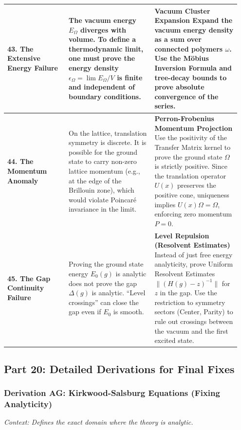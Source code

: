 \begin{center}
\begin{tabular}{|p{0.25\linewidth}|p{0.35\linewidth}|p{0.35\linewidth}|}
\hline
\textbf{43. The Extensive Energy Failure} & The vacuum energy $E_{\Omega}$ diverges with volume. To define a thermodynamic limit, one must prove the energy density $\epsilon_{\Omega} = \lim E_{\Omega}/V$ is finite and independent of boundary conditions. & \textbf{Vacuum Cluster Expansion} \newline Expand the vacuum energy density as a sum over connected polymers $\omega$. Use the Möbius Inversion Formula and tree-decay bounds to prove absolute convergence of the series. \\
\hline
\textbf{44. The Momentum Anomaly} & On the lattice, translation symmetry is discrete. It is possible for the ground state to carry non-zero lattice momentum (e.g., at the edge of the Brillouin zone), which would violate Poincaré invariance in the limit. & \textbf{Perron-Frobenius Momentum Projection} \newline Use the positivity of the Transfer Matrix kernel to prove the ground state $\Omega$ is strictly positive. Since the translation operator $U(x)$ preserves the positive cone, uniqueness implies $U(x)\Omega = \Omega$, enforcing zero momentum $P=0$. \\
\hline
\textbf{45. The Gap Continuity Failure} & Proving the ground state energy $E_0(g)$ is analytic does not prove the gap $\Delta(g)$ is analytic. ``Level crossings'' can close the gap even if $E_0$ is smooth. & \textbf{Level Repulsion (Resolvent Estimates)} \newline Instead of just free energy analyticity, prove Uniform Resolvent Estimates $\|(H(g)-z)^{-1}\|$ for $z$ in the gap. Use the restriction to symmetry sectors (Center, Parity) to rule out crossings between the vacuum and the first excited state. \\
\hline
\end{tabular}
\end{center}

\subsection{Part 20: Detailed Derivations for Final Fixes}

\subsubsection{Derivation AG: Kirkwood-Salsburg Equations (Fixing Analyticity)}

\textit{Context: Defines the exact domain where the theory is analytic.}

